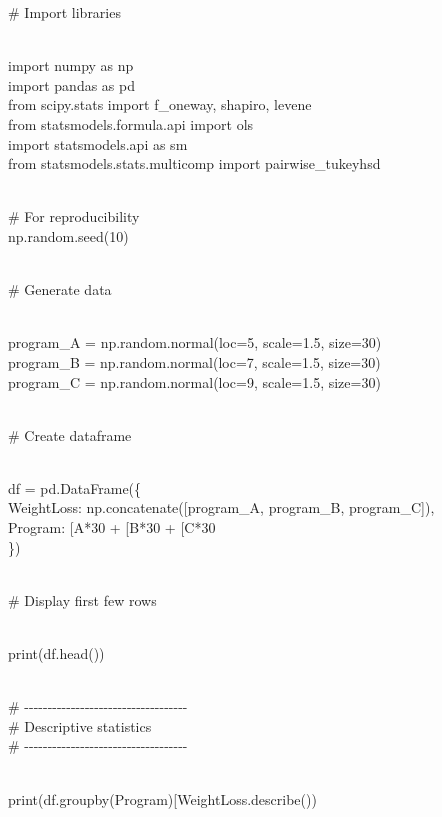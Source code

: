 \documentclass[
]{article}
\begin{document}
\# Import libraries\\
\strut \\
import numpy as np\\
import pandas as pd\\
from scipy.stats import f\_oneway, shapiro, levene\\
from statsmodels.formula.api import ols\\
import statsmodels.api as sm\\
from statsmodels.stats.multicomp import pairwise\_tukeyhsd\\
\strut \\
\# For reproducibility\\
np.random.seed(10)\\
\strut \\
\# Generate data\\
\strut \\
program\_A = np.random.normal(loc=5, scale=1.5, size=30)\\
program\_B = np.random.normal(loc=7, scale=1.5, size=30)\\
program\_C = np.random.normal(loc=9, scale=1.5, size=30)\\
\strut \\
\# Create dataframe\\
\strut \\
df = pd.DataFrame(\{\\
\textquotesingle WeightLoss\textquotesingle:
np.concatenate({[}program\_A, program\_B, program\_C{]}),\\
\textquotesingle Program\textquotesingle:
{[}\textquotesingle A\textquotesingle{]}*30 +
{[}\textquotesingle B\textquotesingle{]}*30 +
{[}\textquotesingle C\textquotesingle{]}*30\\
\})\\
\strut \\
\# Display first few rows\\
\strut \\
print(df.head())\\
\strut \\
\#
-\/-\/-\/-\/-\/-\/-\/-\/-\/-\/-\/-\/-\/-\/-\/-\/-\/-\/-\/-\/-\/-\/-\/-\/-\/-\/-\/-\/-\/-\/-\/-\/-\/-\/-\\
\# Descriptive statistics\\
\#
-\/-\/-\/-\/-\/-\/-\/-\/-\/-\/-\/-\/-\/-\/-\/-\/-\/-\/-\/-\/-\/-\/-\/-\/-\/-\/-\/-\/-\/-\/-\/-\/-\/-\/-\\
\strut \\
print(df.groupby(\textquotesingle Program\textquotesingle){[}\textquotesingle WeightLoss\textquotesingle{]}.describe())\\
\end{document}
